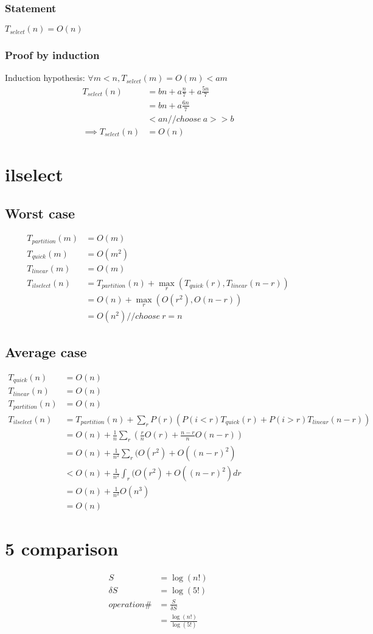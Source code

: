 \documentclass{article}
\begin{document}
\subsubsection{Statement}
$T_{select}(n) = O(n)$
\subsubsection{Proof by induction}
Induction hypothesis: $\forall m < n, T_{select}(m) = O(m) < am$
\begin{align*}
T_{select}(n)
&= bn + a\frac{n}{7} + a\frac{5n}{7}\\
&= bn + a\frac{6n}{7}\\
&< an // choose \ a >> b\\
\implies T_{select}(n) &= O(n)
\end{align*}

\section{ilselect}
\subsection{Worst case}
\begin{align*}
T_{partition}(m) &= O(m)\\
T_{quick}(m) &= O(m^2)\\
T_{linear}(m) &= O(m)\\
T_{ilselect}(n)
&= T_{partition}(n) + \max_r (T_{quick}(r), T_{linear}(n-r))\\
&= O(n) + \max_r (O(r^2), O(n-r))\\
&= O(n^2) // choose \ r = n
\end{align*}
\subsection{Average case}
\begin{align*}
T_{quick}(n) &= O(n)\\
T_{linear}(n) &= O(n)\\
T_{partition}(n) &= O(n)\\
T_{ilselect}(n)
&= T_{partition}(n) + \sum_r P(r) (P(i < r)T_{quick}(r) + P(i > r)
T_{linear}(n-r))\\
&= O(n) + \frac{1}{n} \sum_r (\frac{r}{n}O(r) + \frac{n-r}{n}O(n-r))\\
&= O(n) + \frac{1}{n^2} \sum_r (O(r^2) + O((n-r)^2)\\
&< O(n) + \frac{1}{n^2} \int_r (O(r^2) + O((n-r)^2)dr\\
&= O(n) + \frac{1}{n^2} O(n^3)\\
&= O(n)
\end{align*}

\section{5 comparison}
\begin{align*}
S &= \log(n!)\\
\delta S &= \log(5!)\\
operation\#
&= \frac{S}{\delta S}\\
&= \frac{\log(n!)}{\log(5!)}
\end{align*}
\end{document}

